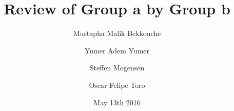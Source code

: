 \documentclass{article}
\title{\huge\sffamily\bfseries Review of Group a by Group b}
\author{ Mustapha Malik Bekkouche \and Yumer Adem Yumer \and Steffen Mogensen \and Oscar Felipe Toro}
\date{May 13th 2016}
\begin{document}
\maketitle


\tableofcontents
\pagebreak









\end{document}
